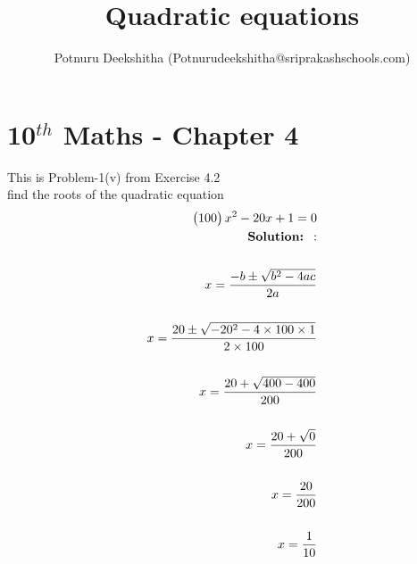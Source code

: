 \documentclass[12pt]{article}
\title{Quadratic equations}
\author{Potnuru Deekshitha (Potnurudeekshitha@sriprakashschools.com)}
\newcommand{\myvec}[1]{\ensuremath{\begin{pmatrix}#1\end{pmatrix}}}
\newcommand{\solution}{\noindent \textbf{Solution: }}
\begin{document}
\section*{10$^{th}$ Maths - Chapter 4}
This is Problem-1(v) from Exercise 4.2\\
find the roots of the quadratic equation\\
\begin{align}
\myvec{100}x^2-{20} x +{1} = 0\\
\solution:\\
\\x=\frac{-b\pm\sqrt{b^2-4ac}}{2a}\\
\\x=\frac{20\pm\sqrt{-20^2-4 \times 100\times1}}{2 \times 100}\\
\\x=\frac{20+\sqrt{400-400}}{200}\\
\\x=\frac{20+\sqrt{0}}{200}\\
\\x=\frac{20}{200}\\
\\x=\frac{1}{10}\\
\end{align}
\end{document}
